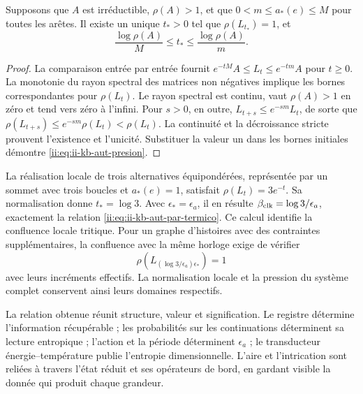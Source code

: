 \begin{proposition}
Supposons que \(A\) est irréductible, \(\rho(A)>1\), et que
\(0<m\leq a_*(e)\leq M\) pour toutes les arêtes. Il existe un unique
\(t_*>0\) tel que \(\rho(L_{t_*})=1\), et
\begin{equation}
 \frac{\log\rho(A)}{M}\leq t_*\leq
 \frac{\log\rho(A)}{m}.
 \label{ii:eq:ii-kb-aut-presion}
\end{equation}
\end{proposition}
\begin{proof}
La comparaison entrée par entrée fournit \(e^{-tM}A\leq L_t\leq e^{-tm}A\) pour \(t\geq0\). La monotonie du rayon spectral des matrices non négatives implique les bornes correspondantes pour \(\rho(L_t)\). Le rayon spectral est continu, vaut \(\rho(A)>1\) en zéro et tend vers zéro à l'infini. Pour \(s>0\), en outre, \(L_{t+s}\leq e^{-sm}L_t\), de sorte que \(\rho(L_{t+s})\leq e^{-sm}\rho(L_t)<\rho(L_t)\). La continuité et la décroissance stricte prouvent l'existence et l'unicité. Substituer la valeur un dans les bornes initiales démontre \eqref{ii:eq:ii-kb-aut-presion}.
\end{proof}

La réalisation locale de trois alternatives équipondérées, représentée
par un sommet avec trois boucles et \(a_*(e)=1\), satisfait
\(\rho(L_t)=3e^{-t}\). Sa normalisation donne \(t_*=\log3\).
Avec \(\epsilon_*=\epsilon_a\), il en résulte
\(\beta_{\rm clk}=\log3/\epsilon_a\), exactement la relation
\eqref{ii:eq:ii-kb-aut-par-termico}. Ce calcul identifie la
confluence locale tritique. Pour un graphe d'histoires avec des contraintes
supplémentaires, la confluence avec la même horloge exige de vérifier
\[
 \rho\!\left(L_{(\log3/\epsilon_a)\epsilon_*}\right)=1
\]
avec leurs incréments effectifs. La normalisation locale et la pression
du système complet conservent ainsi leurs domaines respectifs.

La relation obtenue réunit structure, valeur et signification. Le registre
détermine l'information récupérable ; les probabilités sur les
continuations déterminent sa lecture entropique ; l'action et la période
déterminent \(\epsilon_a\) ; le transducteur énergie--température
publie l'entropie dimensionnelle. L'aire et l'intrication sont
reliées à travers l'état réduit et ses opérateurs de bord,
en gardant visible la donnée qui produit chaque grandeur.
